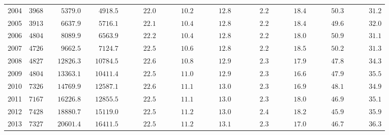 \documentclass[a4paper,12pt,twoside]{book}
\begin{document}
\begin{table}[ht]
{\begin{tabular}{lcccccccccc}
	2004  & $3968$ & $\phantom{000}5379.0$ & $\phantom{000}4918.5$ & $\phantom{00000}22.0$ & $\phantom{00000}10.2$ & $\phantom{00000}12.8$ & $\phantom{000000}2.2$ & $\phantom{00000}18.4$ & $\phantom{00000}50.3$ & $\phantom{00000}31.2$ \\
	2005  & $3913$ & $\phantom{000}6637.9$ & $\phantom{000}5716.1$ & $\phantom{00000}22.1$ & $\phantom{00000}10.4$ & $\phantom{00000}12.8$ & $\phantom{000000}2.2$ & $\phantom{00000}18.4$ & $\phantom{00000}49.6$ & $\phantom{00000}32.0$ \\
	2006  & $4804$ & $\phantom{000}8089.9$ & $\phantom{000}6563.9$ & $\phantom{00000}22.2$ & $\phantom{00000}10.4$ & $\phantom{00000}12.8$ & $\phantom{000000}2.2$ & $\phantom{00000}18.0$ & $\phantom{00000}50.9$ & $\phantom{00000}31.1$ \\
	2007  & $4726$ & $\phantom{000}9662.5$ & $\phantom{000}7124.7$ & $\phantom{00000}22.5$ & $\phantom{00000}10.6$ & $\phantom{00000}12.8$ & $\phantom{000000}2.2$ & $\phantom{00000}18.5$ & $\phantom{00000}50.2$ & $\phantom{00000}31.3$ \\
	2008  & $4827$ & $\phantom{00}12826.3$ & $\phantom{00}10784.5$ & $\phantom{00000}22.6$ & $\phantom{00000}10.8$ & $\phantom{00000}12.9$ & $\phantom{000000}2.3$ & $\phantom{00000}17.9$ & $\phantom{00000}47.8$ & $\phantom{00000}34.3$ \\
	2009  & $4804$ & $\phantom{00}13363.1$ & $\phantom{00}10411.4$ & $\phantom{00000}22.5$ & $\phantom{00000}11.0$ & $\phantom{00000}12.9$ & $\phantom{000000}2.3$ & $\phantom{00000}16.6$ & $\phantom{00000}47.9$ & $\phantom{00000}35.5$ \\
	2010  & $7326$ & $\phantom{00}14769.9$ & $\phantom{00}12587.1$ & $\phantom{00000}22.6$ & $\phantom{00000}11.1$ & $\phantom{00000}13.0$ & $\phantom{000000}2.3$ & $\phantom{00000}16.9$ & $\phantom{00000}48.1$ & $\phantom{00000}34.9$ \\
	2011  & $7167$ & $\phantom{00}16226.8$ & $\phantom{00}12855.5$ & $\phantom{00000}22.5$ & $\phantom{00000}11.1$ & $\phantom{00000}13.0$ & $\phantom{000000}2.3$ & $\phantom{00000}18.0$ & $\phantom{00000}46.9$ & $\phantom{00000}35.1$ \\
	2012  & $7428$ & $\phantom{00}18880.7$ & $\phantom{00}15119.0$ & $\phantom{00000}22.5$ & $\phantom{00000}11.2$ & $\phantom{00000}13.0$ & $\phantom{000000}2.4$ & $\phantom{00000}18.2$ & $\phantom{00000}45.9$ & $\phantom{00000}35.9$ \\
	2013  & $7327$ & $\phantom{00}20601.4$ & $\phantom{00}16411.5$ & $\phantom{00000}22.5$ & $\phantom{00000}11.2$ & $\phantom{00000}13.1$ & $\phantom{000000}2.3$ & $\phantom{00000}17.0$ & $\phantom{00000}46.7$ & $\phantom{00000}36.3$ \\

\end{tabular}}
\end{table}
\end{document}
